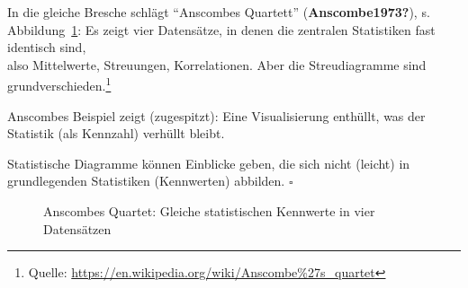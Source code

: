 \documentclass[
  a4paper,
  DIV=11]{scrreprt}
\theoremstyle{definition}
\theoremstyle{definition}
\theoremstyle{definition}
\theoremstyle{remark}
\begin{document}
In die gleiche Bresche schlägt ``Anscombes Quartett''
(\textbf{Anscombe1973?}), s. Abbildung~\ref{fig-dino2}: Es zeigt vier
Datensätze, in denen die zentralen Statistiken fast identisch sind,\\
also Mittelwerte, Streuungen, Korrelationen. Aber die Streudiagramme
sind grundverschieden.\footnote{Quelle:
  \url{https://en.wikipedia.org/wiki/Anscombe\%27s_quartet}}

Anscombes Beispiel zeigt (zugespitzt): Eine Visualisierung enthüllt, was
der Statistik (als Kennzahl) verhüllt bleibt.

\begin{tcolorbox}[enhanced jigsaw, leftrule=.75mm, opacitybacktitle=0.6, colback=white, colframe=quarto-callout-important-color-frame, coltitle=black, colbacktitle=quarto-callout-important-color!10!white, opacityback=0, left=2mm, breakable, titlerule=0mm, toptitle=1mm, bottomtitle=1mm, rightrule=.15mm, title=\textcolor{quarto-callout-important-color}{\faExclamation}\hspace{0.5em}{Wichtig}, arc=.35mm, bottomrule=.15mm, toprule=.15mm]

Statistische Diagramme können Einblicke geben, die sich nicht (leicht)
in grundlegenden Statistiken (Kennwerten) abbilden. \(\square\)

\end{tcolorbox}

\begin{figure}


\caption{\label{fig-dino2}Anscombes Quartet: Gleiche statistischen
Kennwerte in vier Datensätzen}

\end{figure}%
\end{document}
